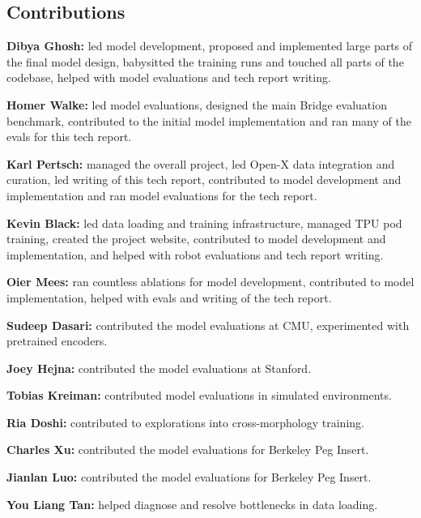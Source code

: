 \begin{appendices}

\section{Contributions}\label{sec:contributions}

    \noindent\textbf{Dibya Ghosh:} led model development, proposed and implemented large parts of the final model design, babysitted the training runs and touched all parts of the codebase, helped with model evaluations and tech report writing.

    \noindent\textbf{Homer Walke:} led model evaluations, designed the main Bridge evaluation benchmark, contributed to the initial model implementation and ran many of the evals for this tech report.

    \noindent\textbf{Karl Pertsch:} managed the overall project, led Open-X data integration and curation, led writing of this tech report, contributed to model development and implementation and ran model evaluations for the tech report.

    \noindent\textbf{Kevin Black:} led data loading and training infrastructure, managed TPU pod training, created the project website, contributed to model development and implementation, and helped with robot evaluations and tech report writing.

    \noindent\textbf{Oier Mees:} ran countless ablations for model development, contributed to model implementation, helped with evals and writing of the tech report.

    \noindent\textbf{Sudeep Dasari:} contributed the model evaluations at CMU, experimented with pretrained encoders.

    \noindent\textbf{Joey Hejna:} contributed the model evaluations at Stanford.

    \noindent\textbf{Tobias Kreiman:} contributed model evaluations in simulated environments.

    \noindent\textbf{Ria Doshi:} contributed to explorations into cross-morphology training.
    
    \noindent\textbf{Charles Xu:} contributed the model evaluations for Berkeley Peg Insert.

    \noindent\textbf{Jianlan Luo:} contributed the model evaluations for Berkeley Peg Insert.

    \noindent\textbf{You Liang Tan:} helped diagnose and resolve bottlenecks in data loading.


\end{appendices}
